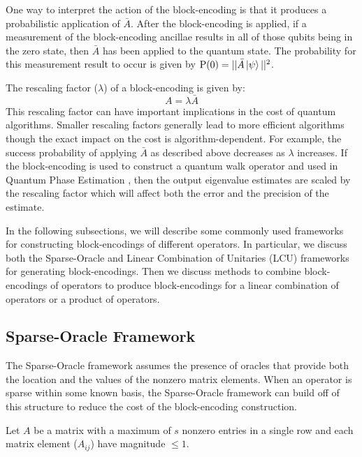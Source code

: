 One way to interpret the action of the block-encoding is that it produces a probabilistic application of $\bar{A}$.
After the block-encoding is applied, if a measurement of the block-encoding ancillae results in all of those qubits being in the zero state, then $\bar{A}$ has been applied to the quantum state.
The probability for this measurement result to occur is given by $\text{P}(0) = ||\bar{A} \ket{\psi}||^2$.

The rescaling factor ($\lambda$) of a block-encoding is given by:
\begin{equation}
    A = \lambda \bar{A}
\end{equation}
This rescaling factor can have important implications in the cost of quantum algorithms. 
Smaller rescaling factors generally lead to more efficient algorithms though the exact impact on the cost is algorithm-dependent.
For example, the success probability of applying $\bar{A}$ as described above decreases as $\lambda$ increases.
If the block-encoding is used to construct a quantum walk operator \cite{low2019hamiltonian, poulin2018quantum} and used in Quantum Phase Estimation \cite{poulin2018quantum, babbush2018encoding, lee2021even}, then the output eigenvalue estimates are scaled by the rescaling factor which will affect both the error and the precision of the estimate.

In the following subsections, we will describe some commonly used frameworks for constructing block-encodings of different operators.
In particular, we discuss both the Sparse-Oracle and Linear Combination of Unitaries (LCU) frameworks for generating block-encodings.
Then we discuss methods to combine block-encodings of operators to produce block-encodings for a linear combination of operators or a product of operators.

\subsection{Sparse-Oracle Framework}
\label{subsec:sparse-be}

The Sparse-Oracle framework \cite{berry2009black, childs2009universal, berry2015hamiltonian,berry2015simulating, low2017optimal,childs2017quantum,gilyen2019quantum} assumes the presence of oracles that provide both the location and the values of the nonzero matrix elements.
When an operator is sparse within some known basis, the Sparse-Oracle framework can build off of this structure to reduce the cost of the block-encoding construction.

Let $A$ be a matrix with a maximum of $s$ nonzero entries in a single row and each matrix element ($A_{ij}$) have magnitude $\leq 1$.

